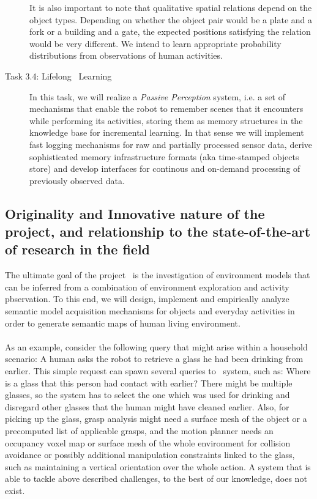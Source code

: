 \begin{description}
  It is also important to note that qualitative spatial relations
  depend on the object types. Depending on whether the
  object pair would be a plate and a fork or a building and a gate,
  the expected positions satisfying the relation would be very
  different. We intend to learn appropriate probability distributions
  from observations of human activities.

\item[Task 3.4: Lifelong \ksem\ Learning]
  In this task, we will realize a 
  \emph{Passive Perception} system, i.e. a set of mechanisms that enable the robot to 
  remember scenes that it encounters while performing its activities, storing them 
  as memory structures in the knowledge base for incremental learning. In that sense we will implement fast 
  logging mechanisms for raw and partially processed sensor data, derive
  sophisticated memory infrastructure formats (aka time-stamped objects store) 
  and develop interfaces for continous and on-demand processing of previously observed data.
\end{description}
\subsection{Originality and Innovative nature of the project, and relationship to the state-of-the-art of 
research in the field}
The ultimate goal of the project \ksem\ is the investigation of 
environment models that can be inferred from a combination of 
environment exploration and activity pbservation. To this end, we 
will design, implement and empirically analyze semantic model 
acquisition mechanisms for objects and everyday activities in order 
to generate semantic maps of human living environment.\\
\\
As an example, consider the following query that might arise within a
household scenario: A human asks the robot to retrieve a glass he had
been drinking from earlier. This simple request can spawn several queries to
\ksem\ system, such as: Where is a glass that this person had contact with earlier?
There might be multiple glasses, so the system has to select the one
which was used for drinking and disregard other glasses that the human
might have cleaned earlier. Also, for picking up the glass, grasp
analysis might need a surface mesh of the object or a precomputed list
of applicable grasps, and the motion planner needs an occupancy voxel
map or surface mesh of the whole environment for collision avoidance or
possibly additional manipulation constraints linked to the glass, such
as maintaining a vertical orientation over the whole action.
A system that is able to tackle above described challenges, to the best of our
knowledge, does not exist.\\
